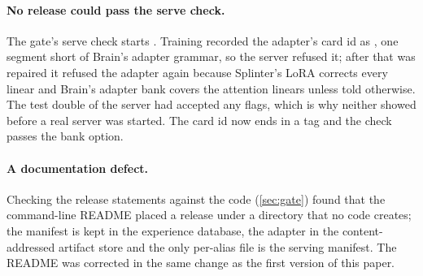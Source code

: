\paragraph{No release could pass the serve check.} The gate's serve check starts
. Training recorded the adapter's card id as
, one segment short of Brain's adapter grammar, so the server
refused it; after that was repaired it refused the adapter again because Splinter's LoRA
corrects every linear and Brain's adapter bank covers the attention linears unless told
otherwise. The test double of the server had accepted any flags, which is why neither showed
before a real server was started. The card id now ends in a tag and the check passes the
bank option.

\paragraph{A documentation defect.} Checking the release statements against the code
(\cref{sec:gate}) found that the command-line README placed a release under a directory that
no code creates; the manifest is kept in the experience database, the adapter in the
content-addressed artifact store and the only per-alias file is the serving manifest.
The README was corrected in the same change as the first version of this paper.
